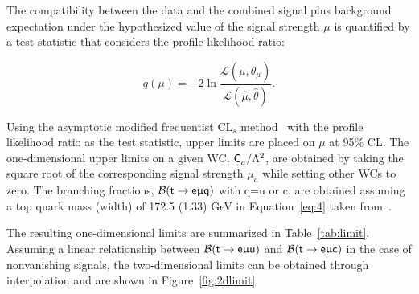 The compatibility between the data and the combined signal plus background expectation under the hypothesized value of the signal strength $\mu$ is quantified by a test statistic that considers the profile likelihood ratio:

\begin{equation}
q(\mu)=-2\ln\frac{\mathcal{L}(\mu,\hat{\theta}_{\mu})}{\mathcal{L}(\hat{\mu},\hat{\theta})}.
\end{equation}

Using the asymptotic modified frequentist CL$_{s}$ method~\cite{Junk:1999kv,Read2002,Cowan:2010js} with the profile likelihood ratio as the test statistic, upper limits are placed on $\mu$ at 95\% \ac{CL}. The one-dimensional upper limits on a given \ac{WC}, $\textsf{C}^{}_{a}/\mathrm{\Lambda}^2$, are obtained by taking the square root of the corresponding signal strength $\mu_a$ while setting other \acp{WC} to zero. The branching fractions, $\mathcal{B} (\textsf{t}\rightarrow\textsf{e}\upmu\textsf{q})$ with q=u or c, are obtained assuming a top quark mass (width) of 172.5 (1.33) GeV in Equation~\ref{eq:4} taken from~\cite{Kile:2008rp}.

The resulting one-dimensional limits are summarized in Table~\ref{tab:limit}. Assuming a linear relationship between $\mathcal{B}(\textsf{t}\rightarrow\textsf{e}\upmu\textsf{u})$ and $\mathcal{B}(\textsf{t}\rightarrow\textsf{e}\upmu\textsf{c})$ in the case of nonvanishing signals, the two-dimensional limits can be obtained through interpolation and are shown in Figure~\ref{fig:2dlimit}. 

\begin{table}[th]
\sffamily
\centering
\caption{Upper limits at 95\% \ac{CL} on \acp{WC} and the branching fractions. The expected and observed upper limits are shown in regular and bold fonts, respectively. The intervals that contain 68\% of the distribution of the expected upper limits are shown in parentheses.}
\label{tab:limit}
\end{table}

